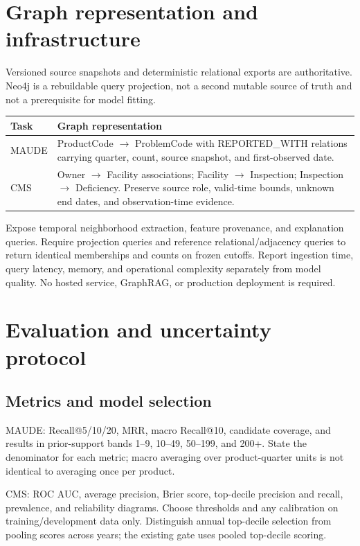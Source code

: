 \documentclass[11pt,a4paper]{article}
\begin{document}
\section{Graph representation and infrastructure}
Versioned source snapshots and deterministic relational exports are authoritative. Neo4j is a rebuildable query projection, not a second mutable source of truth and not a prerequisite for model fitting.
\begin{center}
\begin{tabularx}{\linewidth}{@{}lY@{}}
\toprule
Task & Graph representation\\ \midrule
MAUDE & ProductCode $\to$ ProblemCode with REPORTED\_WITH relations carrying quarter, count, source snapshot, and first-observed date.\\
CMS & Owner $\to$ Facility associations; Facility $\to$ Inspection; Inspection $\to$ Deficiency. Preserve source role, valid-time bounds, unknown end dates, and observation-time evidence.\\
\bottomrule
\end{tabularx}
\end{center}
Expose temporal neighborhood extraction, feature provenance, and explanation queries. Require projection queries and reference relational/adjacency queries to return identical memberships and counts on frozen cutoffs. Report ingestion time, query latency, memory, and operational complexity separately from model quality. No hosted service, GraphRAG, or production deployment is required.

\section{Evaluation and uncertainty protocol}
\subsection{Metrics and model selection}
MAUDE: Recall@5/10/20, MRR, macro Recall@10, candidate coverage, and results in prior-support bands 1--9, 10--49, 50--199, and 200+. State the denominator for each metric; macro averaging over product-quarter units is not identical to averaging once per product.

CMS: ROC AUC, average precision, Brier score, top-decile precision and recall, prevalence, and reliability diagrams. Choose thresholds and any calibration on training/development data only. Distinguish annual top-decile selection from pooling scores across years; the existing gate uses pooled top-decile scoring.
\end{document}
